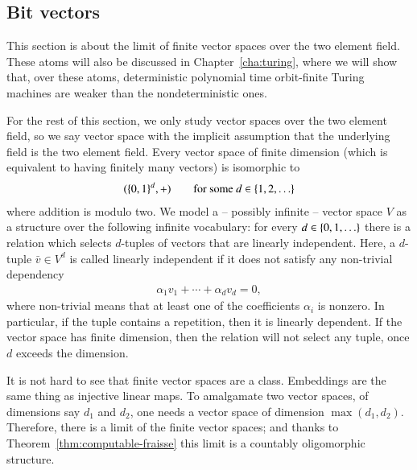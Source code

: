 \subsection{Bit vectors}
\label{sec:bit-vectors}
This section is about the \fraisse limit of finite vector spaces over the two element field. These atoms will also be discussed in Chapter~\ref{cha:turing}, where we will show that, over these atoms, deterministic polynomial time orbit-finite Turing machines are weaker than the nondeterministic ones.

For the rest of this section, we only study vector spaces over the two element field, so we say vector space with the implicit assumption that the underlying field is the two element field. Every  vector space of finite dimension (which is equivalent to having finitely many vectors) is isomorphic to
\begin{align*}
(\{0,1\}^d, +) \qquad \text{for some $d \in \{1,2,\ldots\}$}
\end{align*}
where addition is modulo two.
We model a -- possibly infinite -- vector space $V$ as a structure over the following infinite vocabulary: for every $d \in \{0,1,\ldots\}$ there is a relation which selects $d$-tuples of vectors that are linearly independent. Here, a $d$-tuple $\bar v \in V^d$ is called linearly independent if it does not satisfy any non-trivial dependency
\begin{align*}
\alpha_1 v_1 + \cdots + \alpha_d v_d = 0,
\end{align*}
where non-trivial means that at least one of the coefficients $\alpha_i$ is nonzero. In particular, if the tuple contains a repetition, then it is linearly dependent. If the vector space has finite dimension, then the relation will not select any tuple, once $d$ exceeds the dimension.


It is not hard to see that finite vector spaces are a \fraisse class. Embeddings are the same thing as injective linear maps. To amalgamate two vector spaces, of dimensions say $d_1$ and $d_2$, one needs a vector space of dimension $\max(d_1,d_2)$. Therefore, there is a \fraisse limit of the finite vector spaces; and thanks to Theorem~\ref{thm:computable-fraisse} this limit is a countably oligomorphic structure.

